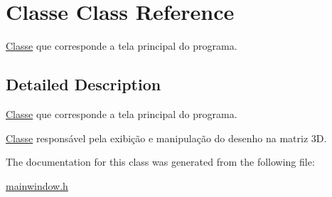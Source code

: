 \hypertarget{classClasse}{}\section{Classe Class Reference}
\label{classClasse}


\mbox{\hyperlink{classClasse}{Classe}} que corresponde a tela principal do programa.  




\subsection{Detailed Description}
\mbox{\hyperlink{classClasse}{Classe}} que corresponde a tela principal do programa. 

\mbox{\hyperlink{classClasse}{Classe}} responsável pela exibição e manipulação do desenho na matriz 3D. 

The documentation for this class was generated from the following file\+:\begin{DoxyCompactItemize}
\item 
\mbox{\hyperlink{mainwindow_8h}{mainwindow.\+h}}\end{DoxyCompactItemize}
